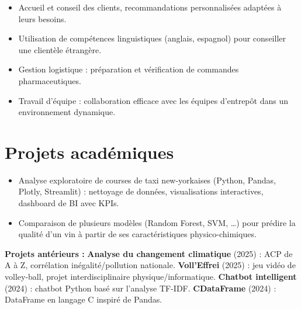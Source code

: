 \documentclass[9.5pt]{article}
\begin{document}
\begin{minipage}[t]{0.645\textwidth}
\vspace{1pt}
\begin{itemize}\small
  \item Accueil et conseil des clients, recommandations personnalisées adaptées à leurs besoins.
  \item Utilisation de compétences linguistiques (anglais, espagnol) pour conseiller une clientèle étrangère.
\end{itemize}

\vspace{1pt}
\begin{itemize}\small
  \item Gestion logistique : préparation et vérification de commandes pharmaceutiques.
  \item Travail d'équipe : collaboration efficace avec les équipes d'entrepôt dans un environnement dynamique.
\end{itemize}

\section*{\large\bfseries\color{accent}Projets académiques}
\vspace{-2pt}
\begin{itemize}\small
  \item Analyse exploratoire de courses de taxi new-yorkaises (Python, Pandas, Plotly, Streamlit) : nettoyage de données, visualisations interactives, dashboard de BI avec KPIs.
\end{itemize}

\vspace{1pt}
\begin{itemize}\small
  \item Comparaison de plusieurs modèles (Random Forest, SVM, \dots) pour prédire la qualité d'un vin à partir de ses caractéristiques physico-chimiques.
\end{itemize}

\vspace{2pt}
\noindent\small
\textbf{Projets antérieurs :}
\textbf{Analyse du changement climatique} (2025) : ACP de A à Z, corrélation inégalité/pollution nationale.
\textbf{Voll'Effrei} (2025) : jeu vidéo de volley-ball, projet interdisciplinaire physique/informatique.
\textbf{Chatbot intelligent} (2024) : chatbot Python basé sur l'analyse TF-IDF.
\textbf{CDataFrame} (2024) : DataFrame en langage C inspiré de Pandas.

\end{minipage}%
\end{document}
